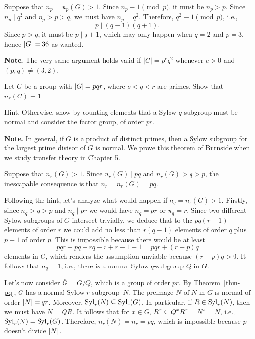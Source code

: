 \begin{solution} Suppose that $n_p=n_p(G)>1$. Since $n_p\equiv1\pmod p$, it must be $n_p>p$. Since $n_p\mid q^2$ and $n_p>p>q$, we must have $n_p=q^2$. Therefore, $q^2\equiv1\pmod p$, i.e., 
$$
    p\mid(q-1)(q+1).
$$
Since $p>q$, it must be $p\mid q+1$, which may only happen when $q=2$ and $p=3$. hence $\left\vert{G}\right\vert=36$ as wanted.  \end{solution}

\textbf{Note.} The very same argument holds valid if $|G|=p^eq^2$ whenever $e>0$ and $(p,q)\ne(3,2)$.


\begin{probl}
    Let\/ $G$ be a group with\/ $\left\vert{G}\right\vert = pqr$, where\/ $p<q<r$ are primes. Show that\/ $n_r(G)=1$.

    \textrm{\rm Hint. Otherwise, show by counting elements that a Sylow $q$-subgroup must be normal and consider the factor group, of order $pr$.}

    \textrm{\rm\textbf{Note.} In general, if $G$ is a product of distinct primes, then a Sylow subgroup for the largest prime divisor of $G$ is normal. We prove this theorem of Burnside when we study transfer theory in Chapter 5.}
\end{probl}

\begin{solution} Suppose that $n_r(G)>1$. Since $n_r(G)\mid pq$ and $n_r(G)>q>p$, the inescapable consequence is that $n_r=n_r(G)=pq$.

Following the hint, let's analyze what would happen if $n_q=n_q(G)>1$. Firstly, since $n_q>q>p$ and $n_q\mid pr$ we would have $n_q=pr$ or $n_q=r$. Since two different Sylow subgroups of $G$ intersect trivially, we deduce that to the $pq(r-1)$ elements of order $r$ we could add no less than $r(q-1)$ elements of order $q$ plus $p-1$ of order $p$. This is impossible because there would be at least 
$$
    pqr - pq + rq - r + r - 1 + 1 = pqr + (r-p)q
$$
elements in $G$, which renders the assumption unviable because $(r-p)q>0$. It follows that $n_q=1$, i.e., there is a normal Sylow $q$-subgroup $Q$ in $G$.

Let's now consider $\bar G=G/Q$, which is a group of order $pr$. By Theorem~\ref{thm-pq}, $\bar G$ has a normal Sylow $r$-subgroup~$\bar N$. The preimage $N$ of $\bar N$ in $G$ is normal of order $\left\vert{N}\right\vert=qr$. Moreover, ${\rm Syl}_r(N)\subseteq{\rm Syl}_r(G)$. In particular, if $R\in{\rm Syl}_r(N)$, then we must have $N=QR$. It follows that for $x\in G$, $R^x\subseteq Q^xR^x=N^x=N$, i.e., ${\rm Syl}_r(N)={\rm Syl}_r(G)$. Therefore, $n_r(N)=n_r=pq$, which is impossible because $p$ doesn't divide $\left\vert{N}\right\vert$.  \end{solution}

